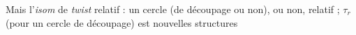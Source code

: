 \documentclass[11pt,a4paper]{article}
\begin{document}
Mais l'\emph{isom} de \emph{twist} \struck{\ill{}} relatif :
un cercle (de découpage ou non),  ou non,
 relatif ; $\tau_r$ (pour un cercle de découpage) est
  nouvelles structures
\end{document}
